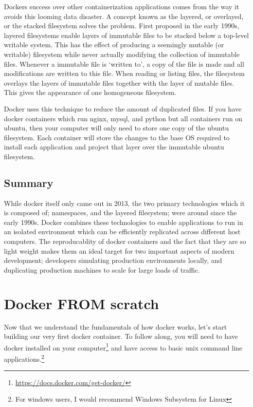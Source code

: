 \documentclass{csse4400}
\begin{document}
Dockers success over other containerization applications comes from the way it avoids this looming data disaster.
A concept known as the layered, or overlayed, or the stacked filesystem solves the problem.
First proposed in the early 1990s, layered filesystems enable layers of immutable files to be stacked below a top-level writable system.
This has the effect of producing a seemingly mutable (or writable) filesystem while never actually modifying the collection of immutable files.
Whenever a immutable file is `written to', a copy of the file is made and all modifications are written to this file.
When reading or listing files, the filesystem overlays the layers of immutable files together with the layer of mutable files.
This gives the appearance of one homogeneous filesystem.

Docker uses this technique to reduce the amount of duplicated files.
If you have docker containers which run nginx, mysql, and python but all containers run on ubuntu,
then your computer will only need to store one copy of the ubuntu filesystem.
Each container will store the changes to the base OS required to install each application and project that layer over the immutable ubuntu filesystem.

\subsection{Summary}
While docker itself only came out in 2013, the two primary technologies which it is composed of; namespaces, and the layered filesystem;
were around since the early 1990s.
Docker combines these technologies to enable applications to run in an isolated environment which can be efficiently replicated across different host computers.
The reproducablity of docker containers and the fact that they are so light weight makes them an ideal target for two important aspects of modern development;
developers simulating production environments locally, and duplicating production machines to scale for large loads of traffic.


\section{Docker FROM scratch}
Now that we understand the fundamentals of how docker works, let's start building our very first docker container.
To follow along, you will need to have docker installed on your
computer\footnote{\url{https://docs.docker.com/get-docker/}} and have access to basic unix command line
applications.\footnote{For windows users, I would recommend Windows Subsystem for Linux}
\end{document}
